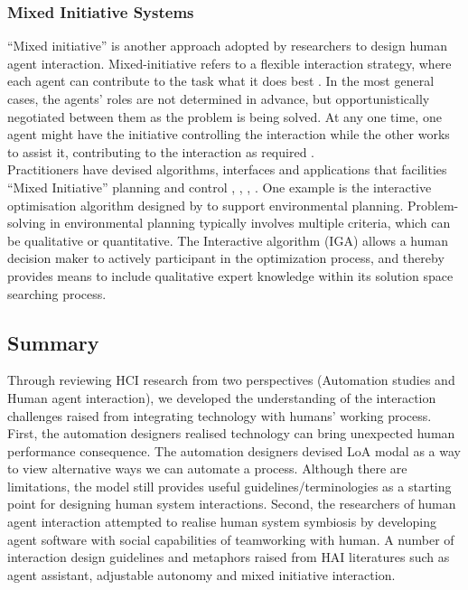 \subsubsection{Mixed Initiative Systems}
``Mixed initiative'' is another approach adopted by researchers to design human agent interaction.  Mixed-initiative refers to a flexible interaction strategy, where each agent can contribute to the task what it does best \cite{Allen1999}. In the most general cases, the agents' roles are not determined in advance, but opportunistically negotiated between them as the problem is being solved. At any one time, one agent might have the initiative controlling the interaction while the other works to assist it, contributing to the interaction as required \cite{Horvitz1999}.\\

Practitioners have devised algorithms, interfaces and applications that facilities ``Mixed Initiative'' planning and control \cite{Ferguson1996}, \cite{Burstein2003}, \cite{Hardin2009}, \cite{Zimmerman2007} . One example is the interactive optimisation algorithm designed by \cite{Yang2012} to support environmental planning. Problem-solving in environmental planning typically involves multiple criteria, which can be qualitative or quantitative. The Interactive algorithm (IGA) allows a human decision maker to actively participant in the optimization process, and thereby provides means to include qualitative expert knowledge within its solution space searching process.\\


\subsection{Summary}
Through reviewing \ac{HCI} research from two perspectives (Automation studies and Human agent interaction), we developed the understanding of the interaction challenges raised from integrating technology with humans' working process.  First, the automation designers realised technology can bring unexpected human performance consequence. The automation designers devised \ac{LoA} modal as a way to view alternative ways we can automate a process. Although there are limitations, the model still provides useful guidelines/terminologies as a starting point for designing human system interactions. Second, the researchers of human agent interaction attempted to realise human system symbiosis by developing agent software with social capabilities of teamworking with human. A number of interaction design guidelines and metaphors raised from \ac{HAI} literatures such as agent assistant, adjustable autonomy and mixed initiative interaction.  \\ 


